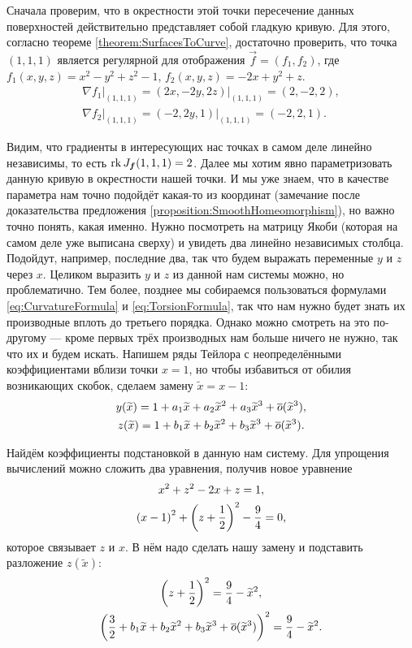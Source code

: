 \begin{solution}
	Сначала проверим, что в окрестности этой точки пересечение данных поверхностей действительно представляет собой гладкую кривую. Для этого, согласно теореме \ref{theorem:SurfacesToCurve}, достаточно проверить, что точка $(1, 1, 1)$ является регулярной для отображения $\vec{f} = (f_1, f_2)$, где $f_1(x, y, z) = x^2 - y^2 + z^2 - 1$, $f_2(x, y, z) = -2x + y^2 + z$.
	\begin{gather*}
		\left.\nabla f_1\right|_{(1, 1, 1)} = \left.(2x, -2y, 2z)\right|_{(1, 1, 1)} = (2, -2, 2),\\
		\left.\nabla f_2\right|_{(1, 1, 1)} = \left.(-2, 2y, 1)\right|_{(1, 1, 1)} = (-2, 2, 1).
	\end{gather*}

	Видим, что градиенты в интересующих нас точках в самом деле линейно независимы, то есть $\operatorname{rk} J_{\boldsymbol{f}}(1, 1, 1) = 2$. Далее мы хотим явно параметризовать данную кривую в окрестности нашей точки. И мы уже знаем, что в качестве параметра нам точно подойдёт какая-то из координат (замечание после доказательства предложения \ref{proposition:SmoothHomeomorphism}), но важно точно понять, какая именно. Нужно посмотреть на матрицу Якоби (которая на самом деле уже выписана сверху) и увидеть два линейно независимых столбца. Подойдут, например, последние два, так что будем выражать переменные $y$ и $z$ через $x$. Целиком выразить $y$ и $z$ из данной нам системы можно, но проблематично. Тем более, позднее мы собираемся пользоваться формулами \eqref{eq:CurvatureFormula} и \eqref{eq:TorsionFormula}, так что нам нужно будет знать их производные вплоть до третьего порядка. Однако можно смотреть на это по-другому --- кроме первых трёх производных нам больше ничего не нужно, так что их и будем искать. Напишем ряды Тейлора с неопределёнными коэффициентами вблизи точки $x = 1$, но чтобы избавиться от обилия возникающих скобок, сделаем замену $\widetilde{x} = x - 1$:
	\begin{gather*}
		y(\widetilde{x}) = 1 + a_1\widetilde{x} + a_2\widetilde{x}^2 + a_3\widetilde{x}^3 + \overline{o}(\widetilde{x}^3),\\
		z(\widetilde{x}) = 1 + b_1\widetilde{x} + b_2\widetilde{x}^2 + b_3\widetilde{x}^3 + \overline{o}(\widetilde{x}^3).
	\end{gather*}

	Найдём коэффициенты подстановкой в данную нам систему. Для упрощения вычислений можно сложить два уравнения, получив новое уравнение
	\begin{gather*}
		x^2 + z^2 - 2x + z = 1,\\
		\left(x - 1\right)^2 + \left(z + \frac{1}{2}\right)^2 - \frac{9}{4} = 0,
	\end{gather*}
	которое связывает $z$ и $x$. В нём надо сделать нашу замену и подставить разложение $z(\widetilde{x})$:
	\begin{gather*}
		\left(z + \frac{1}{2}\right)^2 = \frac{9}{4} - \widetilde{x}^2,\\
		\left(\frac{3}{2} + b_1\widetilde{x} + b_2\widetilde{x}^2 + b_3\widetilde{x}^3 + \overline{o}(\widetilde{x}^3)\right)^2 = \frac{9}{4} - \widetilde{x}^2.
	\end{gather*}
	

\end{solution}
